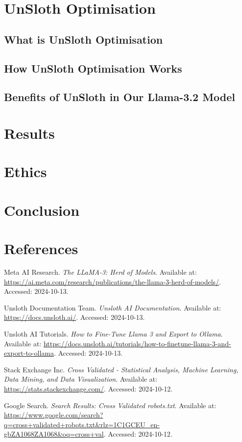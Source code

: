 \documentclass{article}
\begin{document}
\section{UnSloth Optimisation}

\subsection{What is UnSloth Optimisation}

\subsection{How UnSloth Optimisation Works}

\subsection{Benefits of UnSloth in Our Llama-3.2 Model}

\section{Results}

\section{Ethics}

\section{Conclusion}

\section{References}
\begin{thebibliography}{9}

Meta AI Research. \textit{The LLaMA-3: Herd of Models}. Available at: \url{https://ai.meta.com/research/publications/the-llama-3-herd-of-models/}. Accessed: 2024-10-13.

Unsloth Documentation Team. \textit{Unsloth AI Documentation}. Available at: \url{https://docs.unsloth.ai/}. Accessed: 2024-10-13.

Unsloth AI Tutorials. \textit{How to Fine-Tune Llama 3 and Export to Ollama}. Available at: \url{https://docs.unsloth.ai/tutorials/how-to-finetune-llama-3-and-export-to-ollama}. Accessed: 2024-10-13.

Stack Exchange Inc. \textit{Cross Validated - Statistical Analysis, Machine Learning, Data Mining, and Data Visualization}. Available at: \url{https://stats.stackexchange.com/}. Accessed: 2024-10-12.

Google Search. \textit{Search Results: Cross Validated robots.txt}. Available at: \url{https://www.google.com/search?q=cross+validated+robots.txt&rlz=1C1GCEU_en-gbZA1068ZA1068&oq=cross+val}. Accessed: 2024-10-12.

\end{thebibliography}
\end{document}
